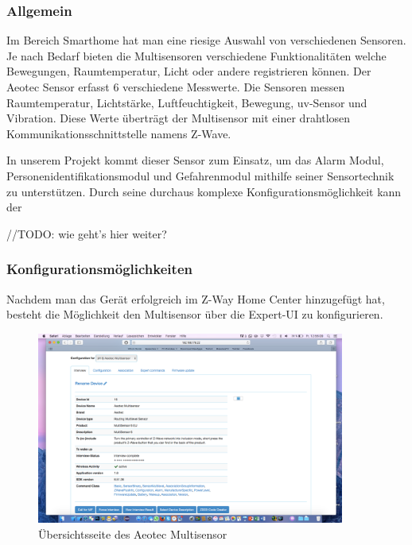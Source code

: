 \subsubsection{Allgemein}

Im Bereich Smarthome hat man eine riesige Auswahl von verschiedenen Sensoren. Je nach Bedarf bieten die Multisensoren verschiedene Funktionalitäten welche Bewegungen, Raumtemperatur, Licht oder andere registrieren können. Der Aeotec Sensor erfasst 6 verschiedene Messwerte. Die Sensoren messen Raumtemperatur, Lichtstärke, Luftfeuchtigkeit, Bewegung, \gls{uv}-Sensor und Vibration. Diese Werte überträgt der Multisensor mit einer drahtlosen Kommunikationsschnittstelle namens Z-Wave.

In unserem Projekt kommt dieser Sensor zum Einsatz, um das Alarm Modul, Personenidentifikationsmodul und Gefahrenmodul mithilfe seiner Sensortechnik zu unterstützen. Durch seine durchaus komplexe Konfigurationsmöglichkeit kann der

//TODO: wie geht's hier weiter?



\subsubsection{Konfigurationsmöglichkeiten}

Nachdem man das Gerät erfolgreich im Z-Way Home Center hinzugefügt hat, besteht die Möglichkeit den Multisensor über die Expert-UI zu konfigurieren. 

\begin{figure}[h!]
	\centering
	\includegraphics[width=0.9\textwidth]{img/Sensorevaluation/AeoScreenshot.png}
	\caption{Übersichtsseite des Aeotec Multisensor}
	\label{fig:sensorenAeoScreenshot}
\end{figure}

